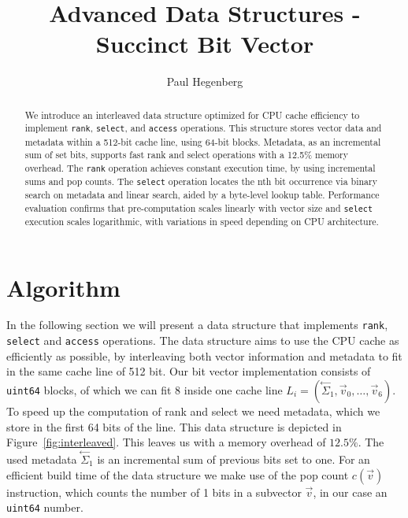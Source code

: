 \documentclass[a4paper,UKenglish,cleveref, autoref, thm-restate]{lipics-v2021}
\title{Advanced Data Structures - Succinct Bit Vector}
\author{Paul Hegenberg}{Karlsruher Institut für Technologie, Germany \and \url{https://github.com/paulheg/kit_advanced_data_structures}}{urlgh@student.kit.edu}{}{}%
\def\code#1{\texttt{#1}}
\newcommand\prevsum[0]{\ensuremath{\overset{\leftarrow}{\Sigma}_1}}
\begin{document}
\maketitle

\begin{abstract}
We introduce an interleaved data structure optimized for CPU cache efficiency to implement \code{rank},
\code{select}, and \code{access} operations. This structure stores vector data and metadata within a
512-bit cache line, using 64-bit blocks. Metadata, as an incremental sum of set bits, supports fast 
rank and select operations with a 12.5\% memory overhead.
The \code{rank} operation achieves constant execution time, by using incremental sums and pop counts.
The \code{select} operation locates the nth bit occurrence via binary search on metadata and linear search,
aided by a byte-level lookup table.
Performance evaluation confirms that pre-computation scales linearly with vector size and \code{select}
execution scales logarithmic, with variations in speed depending on CPU architecture.
\end{abstract}

\section{Algorithm}
In the following section we will present a data structure
that implements \code{rank}, \code{select} and \code{access} operations.
The data structure aims to use the CPU cache as efficiently as possible, by interleaving both
vector information and metadata to fit in the same cache line of 512 bit.
Our bit vector implementation consists of \code{uint64} blocks, of which we can fit 8 inside one cache line
$L_i = (\prevsum, \vec{v}_0, \dots, \vec{v}_6)$.
To speed up the computation of rank and select we need metadata, which we store in the first
64 bits of the line.
This data structure is depicted in Figure~\ref{fig:interleaved}. 
This leaves us with a memory overhead of $12.5\%$. The used metadata $\prevsum$ is an incremental sum of previous bits
set to one. For an efficient build time of the data structure we make use of the pop count $c(\vec{v})$
instruction, which counts the number of 1 bits in a subvector $\vec{v}$, in our case an \code{uint64} number.
\end{document}
